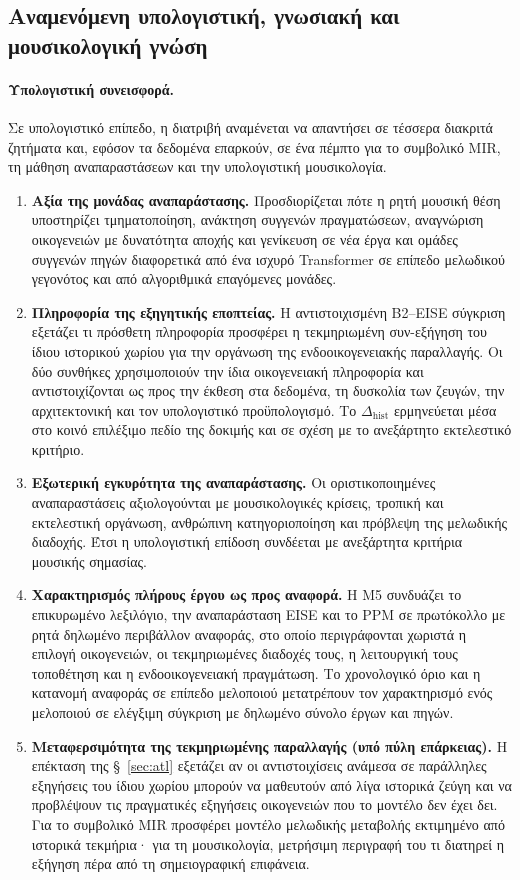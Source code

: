 \documentclass[11pt,a4paper]{article}
\begin{document}
\subsection{Αναμενόμενη υπολογιστική, γνωσιακή και μουσικολογική γνώση}

\paragraph{Υπολογιστική συνεισφορά.}
Σε υπολογιστικό επίπεδο, η διατριβή αναμένεται να απαντήσει σε τέσσερα διακριτά ζητήματα και, εφόσον τα δεδομένα επαρκούν, σε ένα πέμπτο για το συμβολικό MIR, τη μάθηση αναπαραστάσεων και την υπολογιστική μουσικολογία.
\begin{enumerate}[label=\textbf{\arabic*.},leftmargin=2.2em]
\item \textbf{Αξία της μονάδας αναπαράστασης.} Προσδιορίζεται πότε η ρητή μουσική θέση υποστηρίζει τμηματοποίηση, ανάκτηση συγγενών πραγματώσεων, αναγνώριση οικογενειών με δυνατότητα αποχής και γενίκευση σε νέα έργα και ομάδες συγγενών πηγών διαφορετικά από ένα ισχυρό Transformer σε επίπεδο μελωδικού γεγονότος και από αλγοριθμικά επαγόμενες μονάδες.
\item \textbf{Πληροφορία της εξηγητικής εποπτείας.} Η αντιστοιχισμένη B2--EISE σύγκριση εξετάζει τι πρόσθετη πληροφορία προσφέρει η τεκμηριωμένη συν-εξήγηση του ίδιου ιστορικού χωρίου για την οργάνωση της ενδοοικογενειακής παραλλαγής. Οι δύο συνθήκες χρησιμοποιούν την ίδια οικογενειακή πληροφορία και αντιστοιχίζονται ως προς την έκθεση στα δεδομένα, τη δυσκολία των ζευγών, την αρχιτεκτονική και τον υπολογιστικό προϋπολογισμό. Το $\Delta_{\mathrm{hist}}$ ερμηνεύεται μέσα στο κοινό επιλέξιμο πεδίο της δοκιμής και σε σχέση με το ανεξάρτητο εκτελεστικό κριτήριο.
\item \textbf{Εξωτερική εγκυρότητα της αναπαράστασης.} Οι οριστικοποιημένες αναπαραστάσεις αξιολογούνται με μουσικολογικές κρίσεις, τροπική και εκτελεστική οργάνωση, ανθρώπινη κατηγοριοποίηση και πρόβλεψη της μελωδικής διαδοχής. Έτσι η υπολογιστική επίδοση συνδέεται με ανεξάρτητα κριτήρια μουσικής σημασίας.
\item \textbf{Χαρακτηρισμός πλήρους έργου ως προς αναφορά.} Η M5 συνδυάζει το επικυρωμένο λεξιλόγιο, την αναπαράσταση EISE και το PPM σε πρωτόκολλο με ρητά δηλωμένο περιβάλλον αναφοράς, στο οποίο περιγράφονται χωριστά η επιλογή οικογενειών, οι τεκμηριωμένες διαδοχές τους, η λειτουργική τους τοποθέτηση και η ενδοοικογενειακή πραγμάτωση. Το χρονολογικό όριο και η κατανομή αναφοράς σε επίπεδο μελοποιού μετατρέπουν τον χαρακτηρισμό ενός μελοποιού σε ελέγξιμη σύγκριση με δηλωμένο σύνολο έργων και πηγών.
\item \textbf{Μεταφερσιμότητα της τεκμηριωμένης παραλλαγής (υπό πύλη επάρκειας).} Η επέκταση της §~\ref{sec:atl} εξετάζει αν οι αντιστοιχίσεις ανάμεσα σε παράλληλες εξηγήσεις του ίδιου χωρίου μπορούν να μαθευτούν από λίγα ιστορικά ζεύγη και να προβλέψουν τις πραγματικές εξηγήσεις οικογενειών που το μοντέλο δεν έχει δει. Για το συμβολικό MIR προσφέρει μοντέλο μελωδικής μεταβολής εκτιμημένο από ιστορικά τεκμήρια· για τη μουσικολογία, μετρήσιμη περιγραφή του τι διατηρεί η εξήγηση πέρα από τη σημειογραφική επιφάνεια.
\end{enumerate}
\end{document}
